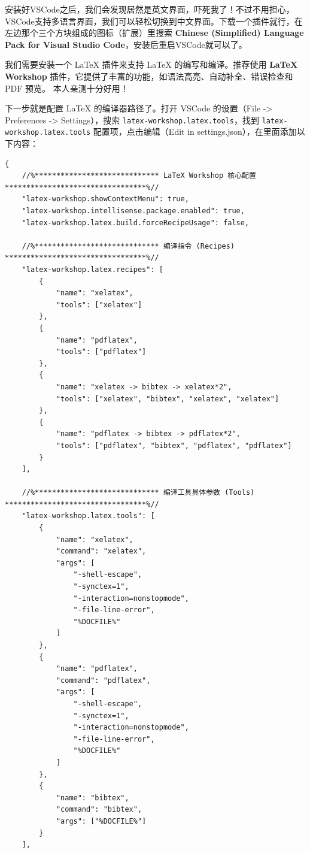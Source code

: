 安装好VSCode之后，我们会发现居然是英文界面，吓死我了！不过不用担心，VSCode支持多语言界面，我们可以轻松切换到中文界面。下载一个插件就行，在左边那个三个方块组成的图标（扩展）里搜索 \textbf{Chinese (Simplified) Language Pack for Visual Studio Code}，安装后重启VSCode就可以了。

我们需要安装一个 \LaTeX{} 插件来支持 \LaTeX{} 的编写和编译。推荐使用 \textbf{LaTeX Workshop} 插件，它提供了丰富的功能，如语法高亮、自动补全、错误检查和 PDF 预览。
本人亲测十分好用！

下一步就是配置 \LaTeX{} 的编译器路径了。打开 VSCode 的设置（File -> Preferences -> Settings），搜索 \texttt{latex-workshop.latex.tools}，找到 \texttt{latex-workshop.latex.tools} 配置项，点击编辑（Edit in settings.json），在里面添加以下内容：
\begin{lstlisting}
{
    //%***************************** LaTeX Workshop 核心配置 *********************************%//
    "latex-workshop.showContextMenu": true,
    "latex-workshop.intellisense.package.enabled": true,
    "latex-workshop.latex.build.forceRecipeUsage": false,

    //%***************************** 编译指令 (Recipes) *********************************%//
    "latex-workshop.latex.recipes": [
        {
            "name": "xelatex",
            "tools": ["xelatex"]
        },
        {
            "name": "pdflatex",
            "tools": ["pdflatex"]
        },
        {
            "name": "xelatex -> bibtex -> xelatex*2",
            "tools": ["xelatex", "bibtex", "xelatex", "xelatex"]
        },
        {
            "name": "pdflatex -> bibtex -> pdflatex*2",
            "tools": ["pdflatex", "bibtex", "pdflatex", "pdflatex"]
        }
    ],

    //%***************************** 编译工具具体参数 (Tools) *********************************%//
    "latex-workshop.latex.tools": [
        {
            "name": "xelatex",
            "command": "xelatex",
            "args": [
                "-shell-escape",
                "-synctex=1",
                "-interaction=nonstopmode",
                "-file-line-error",
                "%DOCFILE%"
            ]
        },
        {
            "name": "pdflatex",
            "command": "pdflatex",
            "args": [
                "-shell-escape",
                "-synctex=1",
                "-interaction=nonstopmode",
                "-file-line-error",
                "%DOCFILE%"
            ]
        },
        {
            "name": "bibtex",
            "command": "bibtex",
            "args": ["%DOCFILE%"]
        }
    ],


\end{lstlisting}
